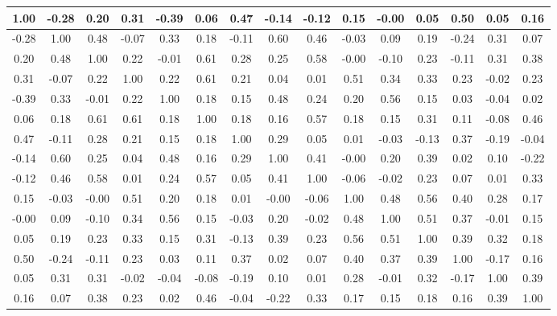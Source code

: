 \begin{tabular}{|c|c|c|c|c|c|c|c|c|c|c|c|c|c|c|}
\hline
1.00&-0.28&0.20&0.31&-0.39&0.06&0.47&-0.14&-0.12&0.15&-0.00&0.05&0.50&0.05&0.16\\\hline
-0.28&1.00&0.48&-0.07&0.33&0.18&-0.11&0.60&0.46&-0.03&0.09&0.19&-0.24&0.31&0.07\\\hline
0.20&0.48&1.00&0.22&-0.01&0.61&0.28&0.25&0.58&-0.00&-0.10&0.23&-0.11&0.31&0.38\\\hline
0.31&-0.07&0.22&1.00&0.22&0.61&0.21&0.04&0.01&0.51&0.34&0.33&0.23&-0.02&0.23\\\hline
-0.39&0.33&-0.01&0.22&1.00&0.18&0.15&0.48&0.24&0.20&0.56&0.15&0.03&-0.04&0.02\\\hline
0.06&0.18&0.61&0.61&0.18&1.00&0.18&0.16&0.57&0.18&0.15&0.31&0.11&-0.08&0.46\\\hline
0.47&-0.11&0.28&0.21&0.15&0.18&1.00&0.29&0.05&0.01&-0.03&-0.13&0.37&-0.19&-0.04\\\hline
-0.14&0.60&0.25&0.04&0.48&0.16&0.29&1.00&0.41&-0.00&0.20&0.39&0.02&0.10&-0.22\\\hline
-0.12&0.46&0.58&0.01&0.24&0.57&0.05&0.41&1.00&-0.06&-0.02&0.23&0.07&0.01&0.33\\\hline
0.15&-0.03&-0.00&0.51&0.20&0.18&0.01&-0.00&-0.06&1.00&0.48&0.56&0.40&0.28&0.17\\\hline
-0.00&0.09&-0.10&0.34&0.56&0.15&-0.03&0.20&-0.02&0.48&1.00&0.51&0.37&-0.01&0.15\\\hline
0.05&0.19&0.23&0.33&0.15&0.31&-0.13&0.39&0.23&0.56&0.51&1.00&0.39&0.32&0.18\\\hline
0.50&-0.24&-0.11&0.23&0.03&0.11&0.37&0.02&0.07&0.40&0.37&0.39&1.00&-0.17&0.16\\\hline
0.05&0.31&0.31&-0.02&-0.04&-0.08&-0.19&0.10&0.01&0.28&-0.01&0.32&-0.17&1.00&0.39\\\hline
0.16&0.07&0.38&0.23&0.02&0.46&-0.04&-0.22&0.33&0.17&0.15&0.18&0.16&0.39&1.00\\\hline
\end{tabular}
